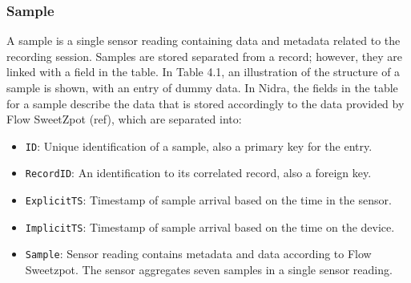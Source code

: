 \begin{table}
\begin{center}
\caption{Example entry in record table}
\end{center}
\end{table}


\subsubsection{Sample}
A sample is a single sensor reading containing data and metadata related to the recording session. Samples are stored separated from a record; however, they are linked with a field in the table.  In Table 4.1, an illustration of the structure of a sample is shown, with an entry of dummy data. In Nidra, the fields in the table for a sample describe the data that is stored accordingly to the data provided by Flow SweetZpot (ref), which are separated into:
\begin{itemize}
	\item \verb|ID|: Unique identification of a sample, also a primary key for the entry.
	\item \verb|RecordID|: An identification to its correlated record, also a foreign key. 
	\item \verb|ExplicitTS|: Timestamp of sample arrival based on the time in the sensor. 
	\item \verb|ImplicitTS|: Timestamp of sample arrival based on the time on the device. 
	\item \verb|Sample|: Sensor reading contains metadata and data according to Flow Sweetzpot. The sensor aggregates seven samples in a single sensor reading. 
\end{itemize}

\begin{table}
\begin{center}
\caption{Example entry in record table}
\end{center}
\end{table}


